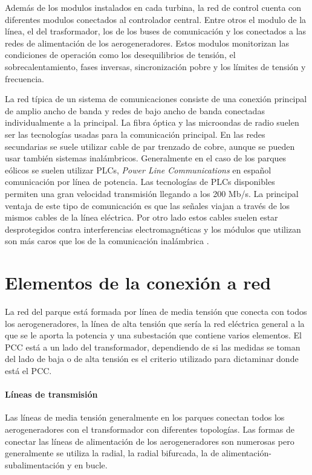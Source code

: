 \documentclass{book}
\begin{document}
		Adem\'as de los modulos instalados en cada turbina, la red de control cuenta con diferentes modulos conectados al controlador central. Entre otros el modulo de la l\'inea, el del trasformador, los de los buses de comunicaci\'on y los conectados a las redes de alimentaci\'on de los aerogeneradores. Estos modulos monitorizan las condiciones de operaci\'on como los desequilibrios de tensi\'on, el sobrecalentamiento, fases inversas, sincronizaci\'on pobre y los l\'imites de tensi\'on y frecuencia\cite{ComunicationControl}.   \par
		La red t\'ipica de un sistema de comunicaciones consiste de una conexi\'on principal de amplio ancho de banda y redes de bajo ancho de banda conectadas individualmente a la principal. La fibra \'optica y las microondas de radio suelen ser las tecnolog\'ias usadas para la comunicaci\'on principal. En las redes secundarias se suele utilizar cable de par trenzado de cobre, aunque se pueden usar tambi\'en sistemas inal\'ambricos. Generalmente en el caso de los parques e\'olicos se suelen utilizar PLCs, \emph{Power Line Communications} en español comunicaci\'on por l\'inea de potencia. Las tecnolog\'ias de PLCs disponibles permiten una gran velocidad transmisi\'on llegando a los 200 Mb/s. La principal ventaja de este tipo de comunicaci\'on es que las señales viajan a trav\'es de los mismos cables de la l\'inea el\'ectrica. Por otro lado estos cables suelen estar desprotegidos contra interferencias electromagn\'eticas y los m\'odulos que utilizan son m\'as caros que los de la comunicaci\'on inal\'ambrica \cite{ComunicationWF}. \par
	
	\section{Elementos de la conexi\'on a red}
	
	La red del parque est\'a formada por l\'inea de media tensi\'on que conecta con todos los aerogeneradores, la l\'inea de alta tensi\'on que ser\'ia la red el\'ectrica general a la que se le aporta la potencia y una subestaci\'on que contiene varios elementos. El PCC est\'a a un lado del transformador, dependiendo de si las medidas se toman del lado de baja o de alta tensi\'on es el criterio utilizado para dictaminar donde est\'a el PCC. \par
		\paragraph {L\'ineas de transmisi\'on}
Las l\'ineas de media tensi\'on generalmente en los parques conectan todos los aerogeneradores con el transformador con diferentes topolog\'ias. Las formas de conectar las l\'ineas de alimentaci\'on de los aerogeneradores son numerosas pero generalmente se utiliza la radial, la radial bifurcada, la de alimentaci\'on-subalimentaci\'on y en bucle. \par
\end{document}
